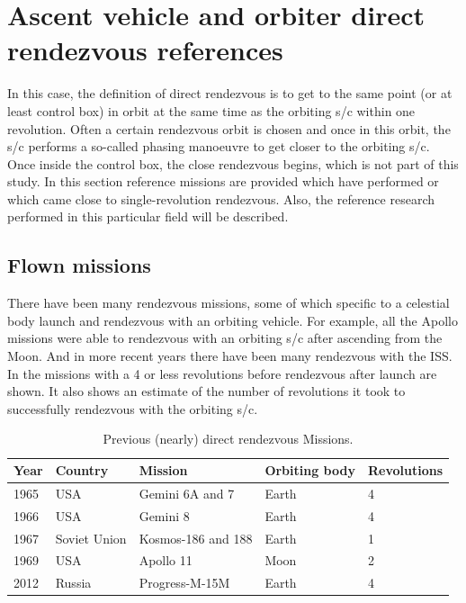 
\section{Ascent vehicle and orbiter direct rendezvous references}
\label{sec:asvehordirenref}
In this case, the definition of direct rendezvous is to get to the same point (or at least control box) in orbit at the same time as the orbiting \ac{s/c} within one revolution. Often a certain rendezvous orbit is chosen and once in this orbit, the \ac{s/c} performs a so-called phasing manoeuvre to get closer to the orbiting \ac{s/c}. Once inside the control box, the close rendezvous begins, which is not part of this study. In this section reference missions are provided which have performed or which came close to single-revolution rendezvous. Also, the reference research performed in this particular field will be described.

\subsection{Flown missions}
\label{subsec:flomis}
There have been many rendezvous missions, some of which specific to a celestial body launch and rendezvous with an orbiting vehicle. For example, all the Apollo missions were able to rendezvous with an orbiting \ac{s/c} after ascending from the Moon. And in more recent years there have been many rendezvous with the \ac{ISS}. In  the missions with a 4 or less revolutions before rendezvous after launch are shown. It also shows an estimate of the number of revolutions it took to successfully rendezvous with the orbiting \ac{s/c}.

\begin{table}[!ht]
\begin{center}
\caption{Previous (nearly) direct rendezvous Missions.}
\label{tab:prevldirrenmis}
\begin{tabular}{|l|l|l|l|l|}
\hline 
\textbf{Year} 		& \textbf{Country} & \textbf{Mission} & \textbf{Orbiting body} & \textbf{Revolutions} \\ \hline \hline
1965 & USA & Gemini 6A and 7 \cite{gemini6a_2014} & Earth & 4  \\ \hline
1966  & USA & Gemini 8 \cite{mayer1968development}& Earth & 4  \\ \hline
1967 & Soviet Union & Kosmos-186 and 188 \cite{ezell1978partnership} & Earth & 1  \\ \hline
1969 & USA & Apollo 11 \cite{apollo1971} & Moon & 2 \\ \hline
2012 & Russia & Progress-M-15M \cite{murtazin2014usage} & Earth & 4   \\ \hline
 
 
\end{tabular}
\end{center}
\end{table}

